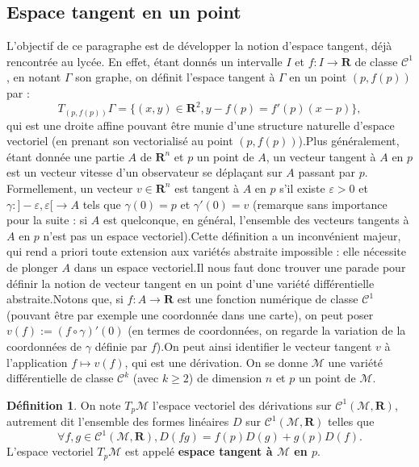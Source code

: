 \documentclass[12pt,a4paper]{article}
\theoremstyle{definition}
\newtheorem{defn}[thm]{Définition}
\begin{document}
\subsection{Espace tangent en un point}
L'objectif de ce paragraphe est de développer la notion d'espace tangent, déjà rencontrée au lycée. En effet, étant donnés un intervalle $I$ et $f:I\to\mathbf{R}$ de classe $\mathcal{C}^1$, en notant $\Gamma$ son graphe, on définit l'espace tangent à $\Gamma$ en un point $(p,f(p))$ par : $$T_{(p,f(p))}\Gamma=\{(x,y)\in\mathbf{R}^2, y-f(p)=f'(p)(x-p)\},$$
qui est une droite affine pouvant être munie d'une structure naturelle d'espace vectoriel (en prenant son vectorialisé au point $(p,f(p))$).\newline Plus généralement, étant donnée une partie $A$ de $\mathbf{R}^n$ et $p$ un point de $A$, un vecteur tangent à $A$ en $p$ est un vecteur vitesse d'un observateur se déplaçant sur $A$ passant par $p$. Formellement, un vecteur $v\in\mathbf{R}^n$ est tangent à $A$ en $p$ s'il existe $\varepsilon>0$ et $\gamma:]-\varepsilon,\varepsilon[\to A$ tels que $\gamma(0)=p$ et $\gamma'(0)=v$ (remarque sans importance pour la suite : si $A$ est quelconque, en général, l'ensemble des vecteurs tangents à $A$ en $p$ n'est pas un espace vectoriel).\newline Cette définition a un inconvénient majeur, qui rend a priori toute extension aux variétés abstraite impossible : elle nécessite de plonger $A$ dans un espace vectoriel.\newline Il nous faut donc trouver une parade pour définir la notion de vecteur tangent en un point d'une variété différentielle abstraite.\newline Notons que, si $f:A\to\mathbf{R}$ est une fonction numérique de classe $\mathcal{C}^1$ (pouvant être par exemple une coordonnée dans une carte), on peut poser $v(f):=(f\circ\gamma)'(0)$ (en termes de coordonnées, on regarde la variation de la coordonnées de $\gamma$ définie par $f$).\newline On peut ainsi identifier le vecteur tangent $v$ à l'application $f\mapsto v(f)$, qui est une dérivation.
\newpage
On se donne $\mathcal{M}$ une variété différentielle de classe $\mathcal{C}^k$ (avec $k\geqslant 2$) de dimension $n$ et $p$ un point de $\mathcal{M}$.\newline 
\begin{defn}
On note $T_p\mathcal{M}$ l'espace vectoriel des dérivations sur $\mathcal{C}^1(\mathcal{M},\mathbf{R})$, autrement dit l'ensemble des formes linéaires $D$ sur $\mathcal{C}^1(\mathcal{M},\mathbf{R})$ telles que
$$\forall f,g\in\mathcal{C}^1(\mathcal{M},\mathbf{R}), D(fg)=f(p)D(g)+g(p)D(f).$$
L'espace vectoriel $T_p\mathcal{M}$ est appelé \textbf{espace tangent à $\mathcal{M}$ en $p$}.
\end{defn}
\end{document}
